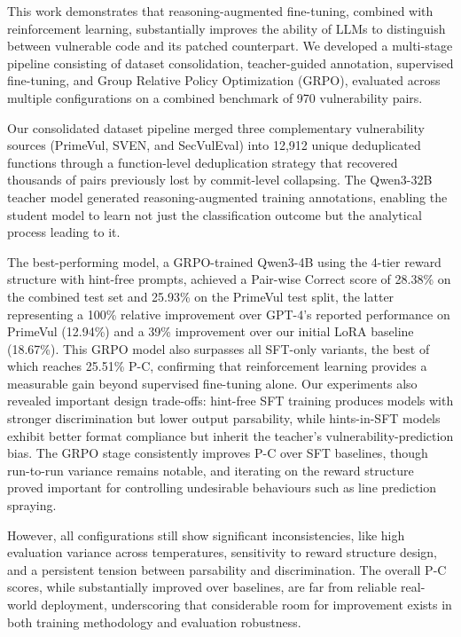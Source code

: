 \documentclass[12pt,a4paper]{article}
\begin{document}
This work demonstrates that reasoning-augmented fine-tuning, combined with reinforcement learning, substantially improves the ability of LLMs to distinguish between vulnerable code and its patched counterpart. We developed a multi-stage pipeline consisting of dataset consolidation, teacher-guided annotation, supervised fine-tuning, and Group Relative Policy Optimization (GRPO), evaluated across multiple configurations on a combined benchmark of 970 vulnerability pairs.

Our consolidated dataset pipeline merged three complementary vulnerability sources (PrimeVul, SVEN, and SecVulEval) into 12,912 unique deduplicated functions through a function-level deduplication strategy that recovered thousands of pairs previously lost by commit-level collapsing. The Qwen3-32B teacher model generated reasoning-augmented training annotations, enabling the student model to learn not just the classification outcome but the analytical process leading to it.

The best-performing model, a GRPO-trained Qwen3-4B using the 4-tier reward structure with hint-free prompts, achieved a Pair-wise Correct score of 28.38\% on the combined test set and 25.93\% on the PrimeVul test split, the latter representing a 100\% relative improvement over GPT-4's reported performance on PrimeVul (12.94\%) and a 39\% improvement over our initial LoRA baseline (18.67\%). This GRPO model also surpasses all SFT-only variants, the best of which reaches 25.51\% P-C, confirming that reinforcement learning provides a measurable gain beyond supervised fine-tuning alone. Our experiments also revealed important design trade-offs: hint-free SFT training produces models with stronger discrimination but lower output parsability, while hints-in-SFT models exhibit better format compliance but inherit the teacher's vulnerability-prediction bias. The GRPO stage consistently improves P-C over SFT baselines, though run-to-run variance remains notable, and iterating on the reward structure proved important for controlling undesirable behaviours such as line prediction spraying.

However, all configurations still show significant inconsistencies, like high evaluation variance across temperatures, sensitivity to reward structure design, and a persistent tension between parsability and discrimination. The overall P-C scores, while substantially improved over baselines, are far from reliable real-world deployment, underscoring that considerable room for improvement exists in both training methodology and evaluation robustness.
\end{document}
